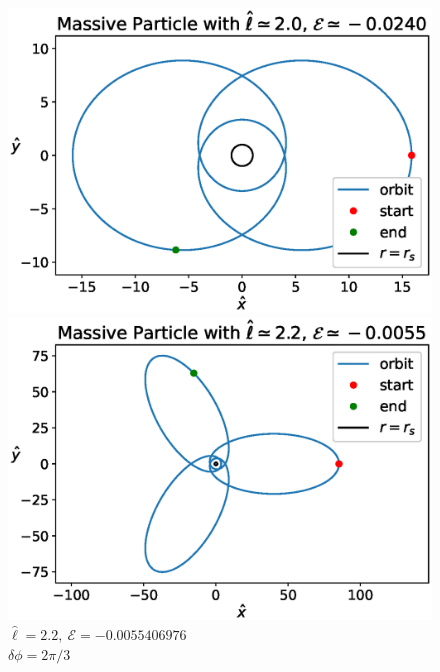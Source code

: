 \begin{figure}[h!]
    \begin{minipage}{0.49\textwidth}
        \centering
        \includegraphics[width=\textwidth]{Figures/appendixB/beautiful2.eps}
        \caption{$\hat \ell = 2, ~ \mathcal E =  -0.0240788493$, \\
        $\delta \phi = \pi$}
        \label{appB:fig:n2}
    \end{minipage}
    \hspace{0.01\textwidth}
    \begin{minipage}{0.49\textwidth}
        \centering
        \includegraphics[width=\textwidth]{Figures/appendixB/beautiful3.eps}
        \caption{$\hat \ell = 2.2, ~ \mathcal E = -0.0055406976$ \\
        $\delta \phi = 2 \pi / 3$}
        \label{appB:fig:n3}
    \end{minipage}
\end{figure}


